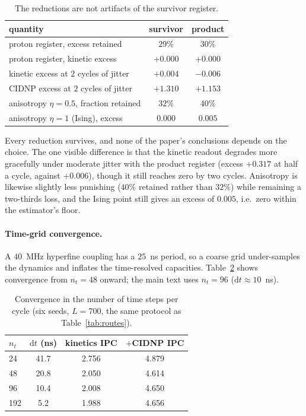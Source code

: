 \documentclass[aps,prx,reprint,superscriptaddress,nofootinbib,floatfix]{revtex4-2}
\begin{document}
\begin{table}[H]
\caption{\label{tab:prodaudit}The reductions are not artifacts of the survivor
register.}
\begin{ruledtabular}
\begin{tabular}{lcc}
quantity & survivor & product \\
\hline
proton register, excess retained & $29\%$ & $30\%$ \\
proton register, kinetic excess & $+0.000$ & $+0.000$ \\
kinetic excess at $2$ cycles of jitter & $+0.004$ & $-0.006$ \\
CIDNP excess at $2$ cycles of jitter & $+1.310$ & $+1.153$ \\
anisotropy $\eta=0.5$, fraction retained & $32\%$ & $40\%$ \\
anisotropy $\eta=1$ (Ising), excess & $0.000$ & $0.005$ \\
\end{tabular}
\end{ruledtabular}
\end{table}

Every reduction survives, and none of the paper's conclusions depends on the
choice. The one visible difference is that the kinetic readout degrades more
gracefully under moderate jitter with the product register (excess $+0.317$ at
half a cycle, against $+0.006$), though it still reaches zero by two cycles.
Anisotropy is likewise slightly less punishing ($40\%$ retained rather than
$32\%$) while remaining a two-thirds loss, and the Ising point still gives an
excess of $0.005$, i.e.\ zero within the estimator's floor.

\paragraph*{Time-grid convergence.} A $40$~MHz hyperfine coupling has a $25$~ns
period, so a coarse grid under-samples the dynamics and inflates the time-resolved
capacities. Table~\ref{tab:grid} shows convergence from $n_t=48$ onward; the main
text uses $n_t=96$ ($\mathrm{d}t\approx10$~ns).

\begin{table}[H]
\caption{\label{tab:grid}Convergence in the number of time steps per cycle (six seeds, $L=700$, the same protocol as Table~\ref{tab:routes}).}
\begin{ruledtabular}
\begin{tabular}{lccc}
$n_t$ & $\mathrm{d}t$ (ns) & kinetics IPC & $+$CIDNP IPC \\
\hline
24 & 41.7 & 2.756 & 4.879 \\
48 & 20.8 & 2.050 & 4.614 \\
96 & 10.4 & 2.008 & 4.650 \\
192 & 5.2 & 1.988 & 4.656 \\
\end{tabular}
\end{ruledtabular}
\end{table}
\end{document}
